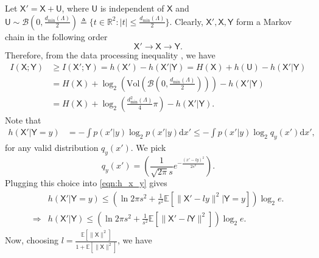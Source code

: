 \documentclass[12pt, draftclsnofoot, onecolumn]{IEEEtran}
\newcommand{\mbb}[1]{\mathbb{#1}}
\newcommand{\msf}[1]{\mathsf{#1}}
\newcommand{\E}{\mathbb{E}}
\theoremstyle{definition}
\begin{document}
\begin{IEEEproof}
Let $\msf{X'} = \msf{X} + \msf{U}$, where $\msf{U}$ is independent of $\msf{X}$ and $\msf{U} \sim \mathcal{B}(0,\frac{d_{\min}(\Lambda)}{2}) \triangleq \{t \in \mathbb{R}^2:|t | \leq \frac{d_{\min}(\Lambda)}{2}\}$. Clearly, $\msf{X'}, \msf{X}, \msf{Y}$ form a Markov chain in the following order
\begin{equation}
    \msf{X'} \rightarrow \msf{X} \rightarrow \msf{Y}.
\end{equation}
Therefore, from the data processing inequality \cite{Cover:2006:EIT:1146355}, we have
\begin{align}\label{eqn:mu_I}
    I(\msf{X};\msf{Y})&\geq I(\msf{X'};\msf{Y}) %
    = h(\msf{X'}) - h(\msf{X'}|\msf{Y}) %
    = H(\msf{X}) + h(\msf{U}) - h(\msf{X'}|\msf{Y}) \nonumber \\
     &= H(\msf{X}) + \log_2\left(\text{Vol}\left(\mathcal{B}\left(0,\frac{d_{\min}(\Lambda)}{2}\right)\right)\right) - h(\msf{X'}|\msf{Y}) \nonumber \\
     &= H(\msf{X}) + \log_2\left(\frac{d^2_{\min}(\Lambda)}{4}\pi\right) - h(\msf{X'}|\msf{Y}).
\end{align}
Note that
\begin{align}\label{eqn:h_x_y}
    h(\msf{X'}|\msf{Y}=y) &= -\int p(x'|y) \log_2 p(x'|y) \text{d}x' %
    \leq -\int p(x'|y) \log_2 q_{y}(x') \text{d}x',
\end{align}
for any valid distribution $q_{y}(x')$. We pick
\begin{equation}
    q_{y}(x') = \left(\frac{1}{\sqrt{2\pi}s}e^{-\frac{(x'-ly)^2}{2s^2}}\right).
\end{equation}
Plugging this choice into \eqref{eqn:h_x_y} gives
\begin{align}
    &h(\msf{X'}|\msf{Y}=y) %
    \leq \left(\ln 2\pi s^2 + \frac{1}{s^2}\mbb{E}\left[ \|\msf{X'}-ly\|^2|\msf{Y}=y\right] \right) \log_2 e. \nonumber \\
    \Rightarrow &h(\msf{X'}|\msf{Y}) \leq \left(\ln 2\pi s^2 + \frac{1}{s^2}\mbb{E} [\|\msf{X'}-l\msf{Y}\|^2] \right) \log_2 e.\label{eqn:h_x_y2}
\end{align}
Now, choosing $l=\frac{\E[\|\msf{X}\|^2]}{1+ \E[\|\msf{X}\|^2]}$, we have
\begin{subequations}
\begin{align}

\end{align}
\end{subequations}
\end{IEEEproof}
\end{document}
